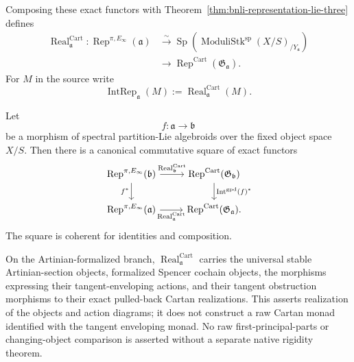 \begin{construction}
Composing these exact functors with
Theorem~\ref{thm:bnli-representation-lie-three} defines
\[
\boxed{
\begin{aligned}
    \operatorname{Real}^{\mathrm{Cart}}_{\mathfrak a}:
    \operatorname{Rep}^{\pi,E_\infty}(\mathfrak a)
    &\xrightarrow{\sim}
    \operatorname{Sp}
    \left(
      \operatorname{ModuliStk}^{\mathrm{sp}}(X/S)_{/Y_{\mathfrak a}}
    \right)\\
    &\longrightarrow
    \operatorname{Rep}^{\mathrm{Cart}}
    (\mathfrak G_{\mathfrak a}).
\end{aligned}}
\]
For $M$ in the source write
\[
    \operatorname{IntRep}_{\mathfrak a}(M)
    :=
    \operatorname{Real}^{\mathrm{Cart}}_{\mathfrak a}(M).
\]
\end{construction}

\begin{proposition}
\label{prop:bnli-native-cartan-realization}
Let
\[
    f:\mathfrak a\longrightarrow\mathfrak b
\]
be a morphism of spectral partition-Lie algebroids over the fixed object
space $X/S$.  Then there is a canonical commutative square of exact functors
\[
\begin{tikzcd}
\operatorname{Rep}^{\pi,E_\infty}(\mathfrak b)
    \arrow[r,"\operatorname{Real}^{\mathrm{Cart}}_{\mathfrak b}"]
    \arrow[d,"f^*"'] &
\operatorname{Rep}^{\mathrm{Cart}}(\mathfrak G_{\mathfrak b})
    \arrow[d,"\operatorname{Int}^{\mathrm{gpd}}(f)^*"]\\
\operatorname{Rep}^{\pi,E_\infty}(\mathfrak a)
    \arrow[r,"\operatorname{Real}^{\mathrm{Cart}}_{\mathfrak a}"'] &
\operatorname{Rep}^{\mathrm{Cart}}(\mathfrak G_{\mathfrak a}).
\end{tikzcd}
\]
The square is coherent for identities and composition.

On the Artinian-formalized branch,
$\operatorname{Real}^{\mathrm{Cart}}_{\mathfrak a}$ carries the universal
stable Artinian-section objects, formalized Spencer cochain objects, the
morphisms expressing their tangent-enveloping actions, and their tangent
obstruction morphisms to their exact pulled-back Cartan realizations.  This
asserts realization of the objects and action diagrams; it does not construct
a raw Cartan monad identified with the tangent enveloping monad.  No raw
first-principal-parts or changing-object comparison is asserted without a
separate native rigidity theorem.
\end{proposition}

